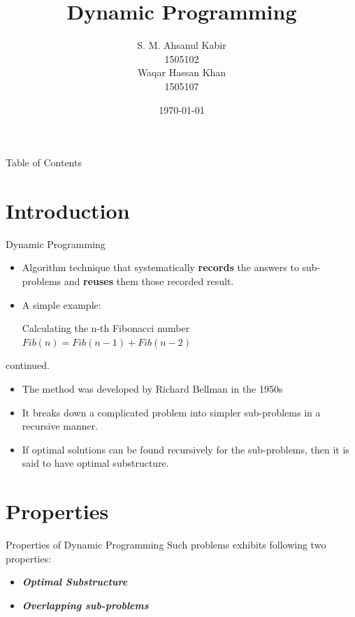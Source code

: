 \documentclass{beamer}
\title[Dynamic Programming]{Dynamic Programming}
\author[1505102, 1505107]{S. M. Ahsanul Kabir \\1505102 \\ Waqar Hassan Khan \\1505107}
\date{\today}
\begin{document}
\titlepage

\begin{frame}{Table of Contents}
    \tableofcontents[]
\end{frame}

\section{Introduction}
\begin{frame}{Dynamic Programming}
    \begin{itemize}
        
        \item<1->
        Algorithm technique that systematically \textbf{records} the answers to sub-problems and \textbf{reuses} them those recorded result.
        \item<2-> A simple example:
        
        Calculating the n-th Fibonacci number
        $Fib(n) = Fib (n-1) + Fib (n-2)$
    \end{itemize}
\end{frame}

\begin{frame}{continued.}
    \begin{itemize}
    
        \item<1-> The method was developed by Richard Bellman in the 1950s
        
        \item<2-> It breaks down a complicated problem into simpler sub-problems in a recursive manner.
        
        \item<3-> If optimal solutions can be found recursively for the sub-problems, then it is said to have optimal substructure.

    \end{itemize}
\end{frame}

\section{Properties}
\begin{frame}{Properties of Dynamic Programming}
    Such problems exhibits following two properties:
    \begin{itemize}
        \item \textbf{\textit{Optimal Substructure}}
        \item \textbf{\textit{Overlapping sub-problems}}
    \end{itemize}{}
\end{frame}
\end{document}
